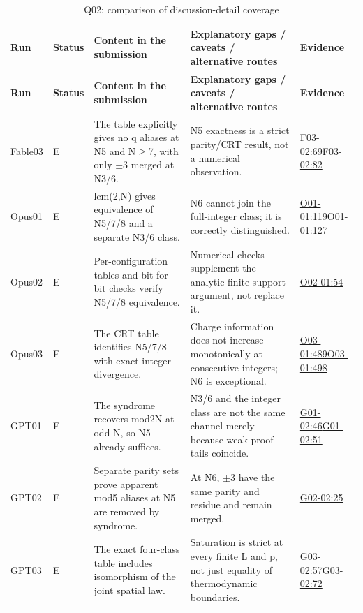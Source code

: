\documentclass[11pt,a4paper]{article}
\begin{document}
{\fontsize{9.0}{12.6}\selectfont
\setlength{\tabcolsep}{2.5pt}
\begin{longtable}{>{\raggedright\arraybackslash}p{}>{\raggedright\arraybackslash}p{}>{\raggedright\arraybackslash}p{}>{\raggedright\arraybackslash}p{}>{\raggedright\arraybackslash}p{}}
\caption{Q02: comparison of discussion-detail coverage}\\
\toprule
\textbf{Run} & \textbf{Status} & \textbf{Content in the submission} & \textbf{Explanatory gaps /\allowbreak{} caveats /\allowbreak{} alternative routes} & \textbf{Evidence}\tabularnewline
\midrule
\endfirsthead
\toprule
\textbf{Run} & \textbf{Status} & \textbf{Content in the submission} & \textbf{Explanatory gaps /\allowbreak{} caveats /\allowbreak{} alternative routes} & \textbf{Evidence}\tabularnewline
\midrule
\endhead
{}Fable03 & E & The table explicitly gives no q aliases at N5 and N\ensuremath{\geq}7,\allowbreak{} with only \ensuremath{\pm}3 merged at N3/\allowbreak{}6. & N5 exactness is a strict parity/\allowbreak{}CRT result,\allowbreak{} not a numerical observation. & \hyperref[src:F03-02]{F03-02:69}\newline \hyperref[src:F03-02]{F03-02:82}\tabularnewline
{}Opus01 & E & lcm(2,\allowbreak{}N) gives equivalence of N5/\allowbreak{}7/\allowbreak{}8 and a separate N3/\allowbreak{}6 class. & N6 cannot join the full-integer class; it is correctly distinguished. & \hyperref[src:O01-01]{O01-01:119}\newline \hyperref[src:O01-01]{O01-01:127}\tabularnewline
{}Opus02 & E & Per-configuration tables and bit-for-bit checks verify N5/\allowbreak{}7/\allowbreak{}8 equivalence. & Numerical checks supplement the analytic finite-support argument,\allowbreak{} not replace it. & \hyperref[src:O02-01]{O02-01:54}\tabularnewline
{}Opus03 & E & The CRT table identifies N5/\allowbreak{}7/\allowbreak{}8 with exact integer divergence. & Charge information does not increase monotonically at consecutive integers; N6 is exceptional. & \hyperref[src:O03-01]{O03-01:489}\newline \hyperref[src:O03-01]{O03-01:498}\tabularnewline
{}GPT01 & E & The syndrome recovers mod2N at odd N,\allowbreak{} so N5 already suffices. & N3/\allowbreak{}6 and the integer class are not the same channel merely because weak proof tails coincide. & \hyperref[src:G01-02]{G01-02:46}\newline \hyperref[src:G01-02]{G01-02:51}\tabularnewline
{}GPT02 & E & Separate parity sets prove apparent mod5 aliases at N5 are removed by syndrome. & At N6,\allowbreak{} \ensuremath{\pm}3 have the same parity and residue and remain merged. & \hyperref[src:G02-02]{G02-02:25}\tabularnewline
{}GPT03 & E & The exact four-class table includes isomorphism of the joint spatial law. & Saturation is strict at every finite L and p,\allowbreak{} not just equality of thermodynamic boundaries. & \hyperref[src:G03-02]{G03-02:57}\newline \hyperref[src:G03-02]{G03-02:72}\tabularnewline
\bottomrule
\end{longtable}
}
\end{document}
